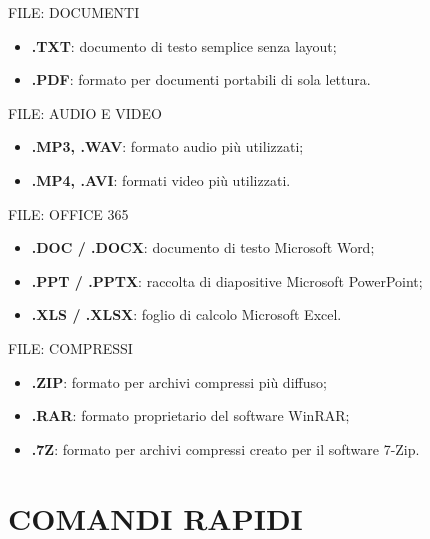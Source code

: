 \documentclass[aspectratio=1610,handout]{beamer}
\begin{document}
\begin{frame}{FILE: DOCUMENTI}
    \begin{itemize}
        \item \textbf{.TXT}: documento di testo semplice senza layout;
        \pause
        \item \textbf{.PDF}: formato per documenti portabili di sola lettura.
    \end{itemize}
\end{frame}

\begin{frame}{FILE: AUDIO E VIDEO}
    \begin{itemize}
        \item \textbf{.MP3, .WAV}: formato audio più utilizzati;
        \pause
        \item \textbf{.MP4, .AVI}: formati video più utilizzati.
    \end{itemize}
\end{frame}

\begin{frame}{FILE: OFFICE 365}
    \begin{itemize}
        \item \textbf{.DOC / .DOCX}: documento di testo Microsoft Word;
        \pause
        \item \textbf{.PPT / .PPTX}: raccolta di diapositive Microsoft PowerPoint;
        \pause
        \item \textbf{.XLS / .XLSX}: foglio di calcolo Microsoft Excel.
    \end{itemize}
\end{frame}

\begin{frame}{FILE: COMPRESSI}
    \begin{itemize}
        \item \textbf{.ZIP}: formato per archivi compressi più diffuso;
        \pause
        \item \textbf{.RAR}: formato proprietario del software WinRAR;
        \pause
        \item \textbf{.7Z}: formato per archivi compressi creato per il software 7-Zip.
    \end{itemize}
\end{frame}

\section{COMANDI RAPIDI}
\end{document}
